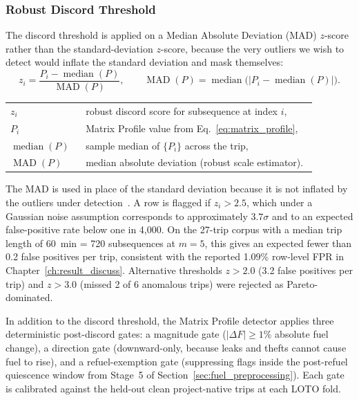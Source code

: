 \subsubsection{Robust Discord Threshold}
The discord threshold is applied on a Median Absolute Deviation (MAD) $z$-score rather than the standard-deviation $z$-score, because the very outliers we wish to detect would inflate the standard deviation and mask themselves:
\begin{equation}
z_i = \frac{P_i - \operatorname{median}(P)}{\operatorname{MAD}(P)}, \qquad \operatorname{MAD}(P) = \operatorname{median}\bigl(|P_i - \operatorname{median}(P)|\bigr).
\label{eq:mp_zscore}
\end{equation}
\noindent\begin{tabular}{@{}p{0.20\linewidth}@{\quad}p{0.68\linewidth}@{}}
$z_i$ & robust discord score for subsequence at index $i$, \\
$P_i$ & Matrix Profile value from Eq.~\ref{eq:matrix_profile}, \\
$\operatorname{median}(P)$ & sample median of $\{P_i\}$ across the trip, \\
$\operatorname{MAD}(P)$ & median absolute deviation (robust scale estimator).
\end{tabular}

\vspace{0.5em}
The MAD is used in place of the standard deviation because it is not inflated by the outliers under detection~\cite{rousseeuw1993mad}. A row is flagged if $z_i > 2.5$, which under a Gaussian noise assumption corresponds to approximately $3.7\sigma$ and to an expected false-positive rate below one in 4{,}000. On the 27-trip corpus with a median trip length of 60~min = 720 subsequences at $m = 5$, this gives an expected fewer than 0.2 false positives per trip, consistent with the reported 1.09\% row-level FPR in Chapter~\ref{ch:result_discuss}. Alternative thresholds $z > 2.0$ (3.2 false positives per trip) and $z > 3.0$ (missed 2 of 6 anomalous trips) were rejected as Pareto-dominated.

In addition to the discord threshold, the Matrix Profile detector applies three deterministic post-discord gates: a magnitude gate ($|\Delta F| \geq 1\%$ absolute fuel change), a direction gate (downward-only, because leaks and thefts cannot cause fuel to rise), and a refuel-exemption gate (suppressing flags inside the post-refuel quiescence window from Stage~5 of Section~\ref{sec:fuel_preprocessing}). Each gate is calibrated against the held-out clean project-native trips at each LOTO fold.

